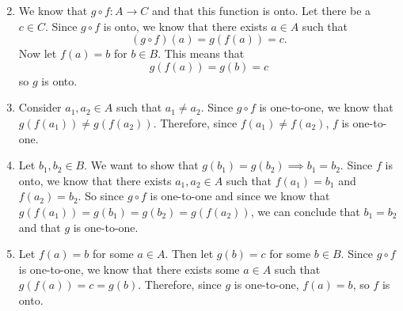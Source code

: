 \documentclass{report}
\begin{document}
\begin{enumerate}[label=\alph*.]
    \setcounter{enumi}{1}
    \item We know that $g \circ f : A \to C$ and that this function is onto. Let there be a $c \in C$. Since $g \circ f$ is onto, we know that there exists $a \in A$ such that $$(g \circ f)(a) = g(f(a)) = c.$$ Now let $f(a) = b$ for $b \in B$. This means that $$g(f(a)) = g(b) = c$$ so $g$ is onto.
    \item Consider $a_1, a_2 \in A$ such that $a_1 \neq a_2$. Since $g \circ f$ is one-to-one, we know that $g(f(a_1)) \neq g(f(a_2))$. Therefore, since $f(a_1) \neq f(a_2)$, $f$ is one-to-one.
    \item Let $b_1, b_2 \in B$. We want to show that $g(b_1) = g(b_2) \implies b_1 = b_2$. Since $f$ is onto, we know that there exists $a_1, a_2 \in A$ such that $f(a_1) = b_1$ and $f(a_2) = b_2$. So since $g \circ f$ is one-to-one and since we know that $g(f(a_1)) = g(b_1) = g(b_2) = g(f(a_2))$, we can conclude that $b_1 = b_2$ and that $g$ is one-to-one.
    \item Let $f(a) = b$ for some $a \in A$. Then let $g(b) = c$ for some $b \in B$. Since $g \circ f$ is one-to-one, we know that there exists some $a \in A$ such that $g(f(a)) = c = g(b)$. Therefore, since $g$ is one-to-one, $f(a) = b$, so $f$ is onto. 
\end{enumerate}


\sol
\end{document}
